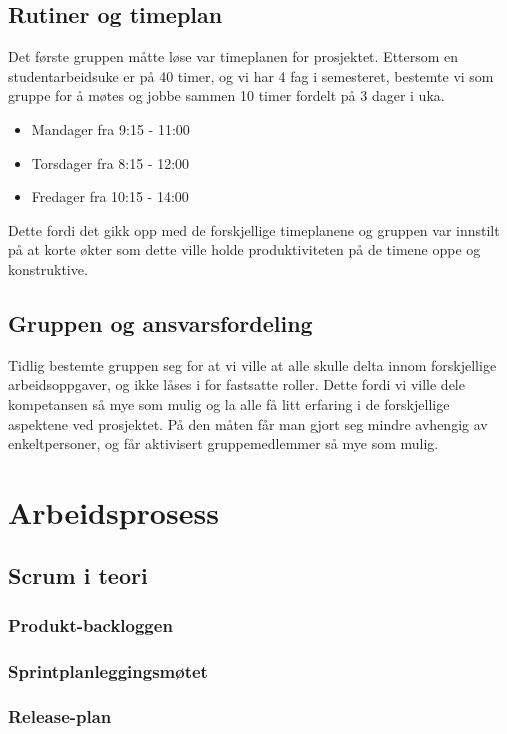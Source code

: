 \documentclass[12pt,a4paper,norsk]{article}
\begin{document}
\subsection{Rutiner og timeplan}

Det første gruppen måtte løse var timeplanen for prosjektet. Ettersom en studentarbeidsuke er på 40 timer, og vi har 4 fag i semesteret, bestemte vi som gruppe for å møtes og jobbe sammen 10 timer fordelt på 3 dager i uka.

\begin{itemize}
  \item[] Mandager fra 9:15 - 11:00 
  \item[] Torsdager fra 8:15 - 12:00
  \item[] Fredager fra 10:15 - 14:00
\end{itemize}

Dette fordi det gikk opp med de forskjellige timeplanene og gruppen var innstilt på at korte økter som dette ville holde produktiviteten på de timene oppe og konstruktive. 

\subsection{Gruppen og ansvarsfordeling}

Tidlig bestemte gruppen seg for at vi ville at alle skulle delta innom forskjellige arbeidsoppgaver, og ikke låses i for fastsatte roller. Dette fordi vi ville dele kompetansen så mye som mulig og la alle få litt erfaring i de forskjellige aspektene ved prosjektet. På den måten får man gjort seg mindre avhengig av enkeltpersoner, og får aktivisert gruppemedlemmer så mye som mulig. 

	\section{Arbeidsprosess}
	\subsection{Scrum i teori}
	\subsubsection{Produkt-backloggen}
	\subsubsection{Sprintplanleggingsmøtet}
	\subsubsection{Release-plan}
\end{document}
